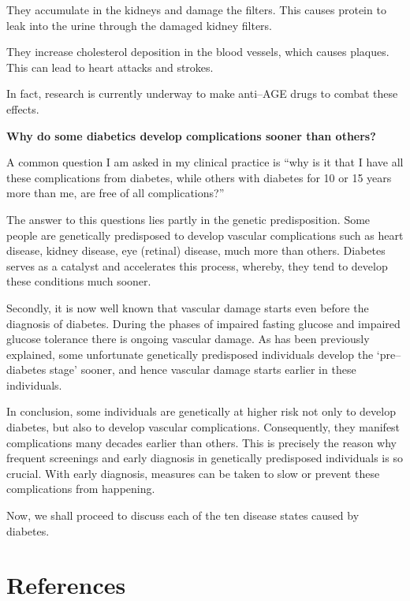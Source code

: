  \item They accumulate in the kidneys and damage the filters. This causes protein to leak into the urine through the damaged kidney filters.

 \item They increase cholesterol deposition in the blood vessels, which causes plaques. This can lead to heart attacks and strokes.

In fact, research is currently underway to make anti–AGE drugs to combat these effects. 

\textbf{Why do some diabetics develop complications sooner than others?}

A common question I am asked in my clinical practice is “why is it that I have all these complications from diabetes, while others with diabetes for 10 or 15 years more than me, are free of all complications?”

The answer to this questions lies partly in the genetic predisposition. Some people are genetically predisposed to develop vascular complications such as heart disease, kidney disease, eye (retinal) disease, much more than others. Diabetes serves as a catalyst and accelerates this process, whereby, they tend to develop these conditions much sooner.

Secondly, it is now well known that vascular damage starts even before the diagnosis of diabetes. During the phases of impaired fasting glucose and impaired glucose tolerance there is ongoing vascular damage. As has been previously explained, some unfortunate genetically predisposed individuals develop the ‘pre–diabetes stage’ sooner, and hence vascular damage starts earlier in these individuals.

In conclusion, some individuals are genetically at higher risk not only to develop diabetes, but also to develop vascular complications. Consequently, they manifest complications many decades earlier than others. This is precisely the reason why frequent screenings and early diagnosis in genetically predisposed individuals is so crucial. With early diagnosis, measures can be taken to slow or prevent these complications from happening.

Now, we shall proceed to discuss each of the ten disease states caused by diabetes.

\section*{References}

